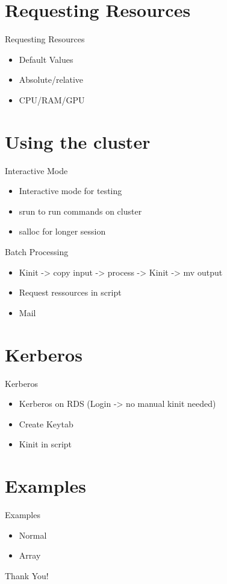 \documentclass{beamer}
\begin{document}
\section{Requesting Resources}
\begin{frame}{Requesting Resources}
	\begin{itemize}
		\item Default Values
		\item Absolute/relative
		\item CPU/RAM/GPU
	\end{itemize}
\end{frame}

\section{Using the cluster}
\begin{frame}{Interactive Mode}
	\begin{itemize}
		\item Interactive mode for testing
		\item srun to run commands on cluster
		\item salloc for longer session
	\end{itemize}
\end{frame}



\begin{frame}{Batch Processing}
	\begin{itemize}
		\item Kinit -> copy input -> process -> Kinit -> mv output
		\item Request ressources in script
		\item Mail
	\end{itemize}
\end{frame}

\section{Kerberos}
\begin{frame}{Kerberos}
	\begin{itemize}
		\item Kerberos on RDS (Login -> no manual kinit needed)
		\item Create Keytab
		\item Kinit in script
	\end{itemize}
\end{frame}

\section{Examples}
\begin{frame}{Examples}
	\begin{itemize}
		\item Normal
		\item Array
	\end{itemize}
\end{frame}
\begin{frame}
    \centering \Large
    Thank You!
\end{frame}
\end{document}
